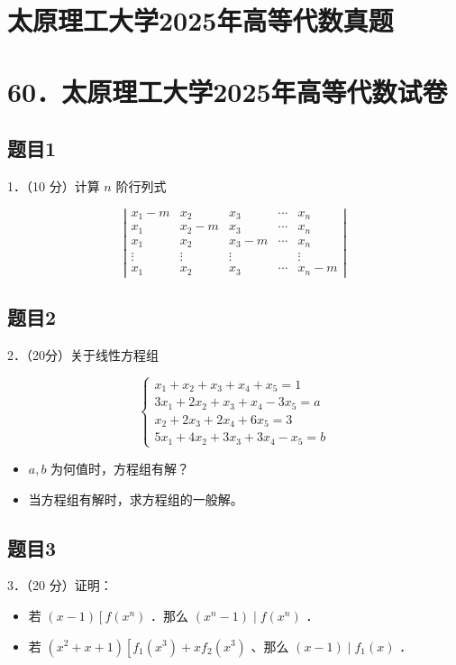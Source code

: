 \documentclass{article}
\begin{document}
\section*{太原理工大学2025年高等代数真题}
\section*{60．太原理工大学2025年高等代数试卷}

\subsection{题目1}
1．（10 分）计算 \(n\) 阶行列式

\[
\left|\begin{array}{ccccc}
x_{1}-m & x_{2} & x_{3} & \cdots & x_{n} \\
x_{1} & x_{2}-m & x_{3} & \cdots & x_{n} \\
x_{1} & x_{2} & x_{3}-m & \cdots & x_{n} \\
\vdots & \vdots & \vdots & & \vdots \\
x_{1} & x_{2} & x_{3} & \cdots & x_{n}-m
\end{array}\right|
\]

\subsection{题目2}
2．（20分）关于线性方程组

\[
\left\{\begin{array}{l}
x_{1}+x_{2}+x_{3}+x_{4}+x_{5}=1 \\
3 x_{1}+2 x_{2}+x_{3}+x_{4}-3 x_{5}=a \\
x_{2}+2 x_{3}+2 x_{4}+6 x_{5}=3 \\
5 x_{1}+4 x_{2}+3 x_{3}+3 x_{4}-x_{5}=b
\end{array}\right.
\]

\begin{itemize}
  \item[（1）] \(a, b\) 为何值时，方程组有解？
  \item[（2）] 当方程组有解时，求方程组的一般解。
\end{itemize}

\subsection{题目3}
3．（20 分）证明：

\begin{itemize}
  \item[（1）] 若 \((x-1)\left[f\left(x^{n}\right)\right.\) ．那么 \(\left(x^{n}-1\right) \mid f\left(x^{n}\right)\) ．
  \item[（2）] 若 \(\left(x^{2}+x+1\right)\left[f_{1}\left(x^{3}\right)+x f_{2}\left(x^{3}\right)\right.\) 、那么 \((x-1) \mid f_{1}(x)\) ．
\end{itemize}
\end{document}
